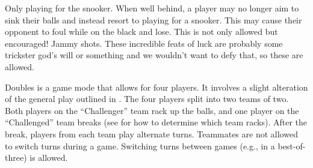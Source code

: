 
 Only playing for the snooker. When well behind, a player may no longer aim to sink their balls and instead resort to playing for a snooker. This may cause their opponent to foul while on the black and lose. This is not only allowed but encouraged!%
 Jammy shots. These incredible feats of luck are probably some trickster god's will or something and we wouldn't want to defy that, so these are allowed.%


 Doubles is a game mode that allows for four players. It involves a slight alteration of the general play outlined in .%
 The four players split into two teams of two.%
 Both players on the “Challenger” team rack up the balls, and one player on the “Challenged” team breaks (see  for how to determine which team racks).%
 After the break, players from each team play alternate turns.%
 Teammates are not allowed to switch turns during a game. Switching turns between games (e.g., in a best-of-three) is allowed.%


%
 {}%
 {}%
\Sportsmanship%
